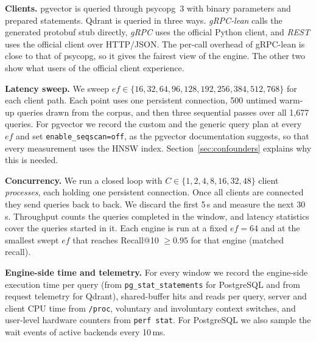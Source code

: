 \documentclass[preprint,12pt]{elsarticle}
\begin{document}
\textbf{Clients.} pgvector is queried through psycopg~3 with binary parameters and
prepared statements. Qdrant is queried in three ways. \emph{gRPC-lean} calls the
generated protobuf stub directly, \emph{gRPC} uses the official Python client, and
\emph{REST} uses the official client over HTTP/JSON. The per-call overhead of gRPC-lean
is close to that of psycopg, so it gives the fairest view of the engine. The other two
show what users of the official client experience.

\textbf{Latency sweep.} We sweep $ef\in\{16,32,64,96,128,192,256,384,512,768\}$ for
each client path. Each point uses one persistent connection, 500 untimed warm-up queries
drawn from the corpus, and then three sequential passes over all 1{,}677 queries. For
pgvector we record the custom and the generic query plan at every $ef$ and set
\texttt{enable\_seqscan=off}, as the pgvector documentation suggests, so that every
measurement uses the HNSW index. Section~\ref{sec:confounders} explains why this is
needed.

\textbf{Concurrency.} We run a closed loop with $C\in\{1,2,4,8,16,32,48\}$ client
\emph{processes}, each holding one persistent connection. Once all clients are
connected they send queries back to back. We discard the first 5\,s and measure the next
30\,s. Throughput counts the queries completed in the window, and latency statistics
cover the queries started in it. Each engine is run at a fixed $ef=64$ and at the
smallest swept $ef$ that reaches Recall@10 $\geq 0.95$ for that engine (matched recall).

\textbf{Engine-side time and telemetry.} For every window we record the engine-side
execution time per query (from \texttt{pg\_stat\_statements} for PostgreSQL and from
request telemetry for Qdrant), shared-buffer hits and reads per query, server and client
CPU time from \texttt{/proc}, voluntary and involuntary context switches, and user-level
hardware counters from \texttt{perf stat}. For PostgreSQL we also sample the wait events
of active backends every 10\,ms.
\end{document}

